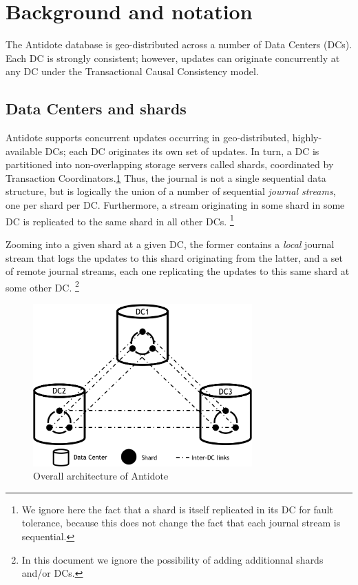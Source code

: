\documentclass[11pt]{article}
\begin{document}
\section{Background and notation}
\label{sec:background}
The Antidote database is geo-distributed across a number of Data Centers
(DCs).
Each DC is strongly consistent; however, updates can originate
concurrently at any DC under the Transactional Causal Consistency model.

\subsection{Data Centers and shards}
\label{sec:dc-shards}
Antidote supports concurrent updates occurring in geo-distributed,
highly-available DCs; each DC originates its own set of updates.
In turn, a DC is partitioned into non-overlapping storage servers called
shards, coordinated by Transaction Coordinators.\ref{fig:architecture}
Thus, the journal is not a single sequential data structure, but is
logically the union of a number of sequential \emph{journal streams},
one per shard per DC\@.
Furthermore, a stream originating in some shard in some DC is replicated
to the same shard in all other DCs.%
%
\footnote{
%
  We ignore here the fact that a shard is itself replicated in its DC
  for fault tolerance, because this does not change the fact that each
  journal stream is sequential.
}
%

Zooming into a given shard at a given DC, the former contains a \emph{local}
journal stream that logs the updates to this shard originating from the latter,
and a set of remote journal streams, each one replicating the
updates to this same shard at some other DC\@.
%
\footnote{
  In this document we ignore the possibility of adding additionnal shards 
  and/or DCs. 
}

\begin{figure}[tp]
  \centering
  \includegraphics[width=0.75\textwidth]{figures/datacentres.png}
  \caption{Overall architecture of Antidote}
  \label{fig:architecture}
\end{figure}
\end{document}
